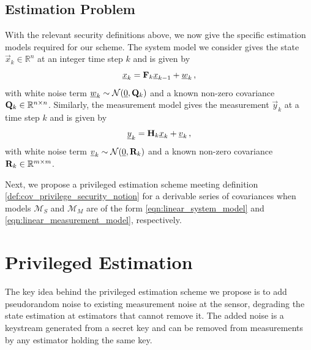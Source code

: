 \documentclass[letterpaper, 10 pt, conference]{ieeeconf}
\begin{document}
\subsection{Estimation Problem}
With the relevant security definitions above, we now give the specific estimation models required for our scheme. The system model we consider gives the state $\vec{x}_k\in\mathbb{R}^n$ at an integer time step $k$ and is given by
\begin{equation}\label{eqn:linear_system_model}
   {\underline{x}}_k = {{\mathbf{F}}}_k{\underline{x}}_{k-1} + {\underline{w}}_k\,,
\end{equation}
with white noise term ${\underline{w}}_k\sim \mathcal{N}({\underline{0}}, {{\mathbf{Q}}}_k)$ and a known non-zero covariance ${{\mathbf{Q}}}_k\in \mathbb{R}^{n\times n}$. Similarly, the measurement model gives the measurement $\vec{y}_k$ at a time step $k$ and is given by
\begin{equation}\label{eqn:linear_measurement_model}
   {\underline{y}}_k = {{\mathbf{H}}}_k{\underline{x}}_k + {\underline{v}}_k\,,
\end{equation}
with white noise term ${\underline{v}}_k\sim \mathcal{N}({\underline{0}}, {{\mathbf{R}}}_k)$ and a known non-zero covariance ${{\mathbf{R}}}_k\in \mathbb{R}^{m\times m}$.

Next, we propose a privileged estimation scheme meeting definition \ref{def:cov_privilege_security_notion} for a derivable series of covariances when models $\mathcal{M}_S$ and $\mathcal{M}_M$ are of the form \eqref{eqn:linear_system_model} and \eqref{eqn:linear_measurement_model}, respectively.

% 
%                                                                                
%                                                                                
%                                                                                
% 

\section{Privileged Estimation}\label{sec:priv_estimation}
The key idea behind the privileged estimation scheme we propose is to add pseudorandom noise to existing measurement noise at the sensor, degrading the state estimation at estimators that cannot remove it. The added noise is a keystream generated from a secret key and can be removed from measurements by any estimator holding the same key.
\end{document}
